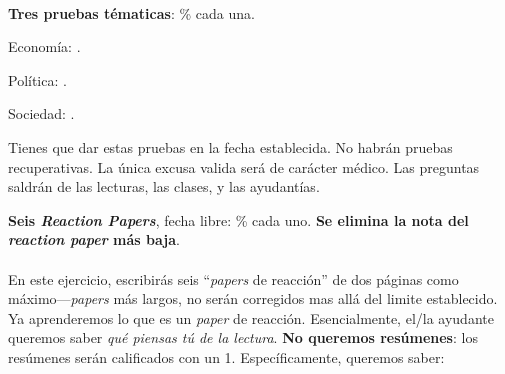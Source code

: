 \documentclass[letterpaper]{article}
\renewenvironment{itemize}{
  \begin{list}{}{
    \setlength{\leftmargin}{1.5em}
  }
}{
  \end{list}
}
\begin{document}
\begin{enumerate}
	\\

	\item {\bf Tres pruebas t\'ematicas}: {\unskip}\% cada una.

		\begin{itemize}
			\item[$\bullet$] Econom\'ia: {\unskip}.
			\item[$\bullet$] Pol\'itica: {\unskip}.
			\item[$\bullet$] Sociedad: {\unskip}.
		\end{itemize}

Tienes que dar estas pruebas en la fecha establecida. No habr\'an pruebas recuperativas. La \'unica excusa valida ser\'a de car\'acter m\'edico. Las preguntas saldr\'an de las lecturas, las clases, y las ayudant\'ias.


	\item {\bf Seis \emph{Reaction Papers}}, fecha libre: {\unskip}\% cada uno. {\bf Se elimina la nota del \emph{reaction paper} m\'as baja}.
	\\ 
	\\
	En este ejercicio, escribir\'as seis ``\emph{papers} de reacci\'on'' de dos p\'aginas como m\'aximo---{\emph{papers}} m\'as largos, no ser\'an corregidos mas all\'a del limite establecido. Ya aprenderemos lo que es un \emph{paper} de reacci\'on. Esencialmente, el/la ayudante queremos saber \emph{qu\'e piensas t\'u de la lectura}. {\bf No queremos res\'umenes}: los res\'umenes ser\'an calificados con un 1. Espec\'ificamente, queremos saber: 


\end{enumerate}
\end{document}
